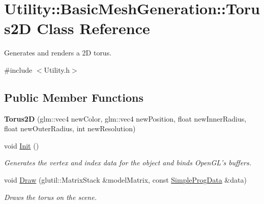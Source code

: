 \hypertarget{class_utility_1_1_basic_mesh_generation_1_1_torus2_d}{\section{Utility\-:\-:Basic\-Mesh\-Generation\-:\-:Torus2\-D Class Reference}
\label{class_utility_1_1_basic_mesh_generation_1_1_torus2_d}
}


Generates and renders a 2\-D torus.  




{\ttfamily \#include $<$Utility.\-h$>$}

\subsection*{Public Member Functions}
\begin{DoxyCompactItemize}
\item 
\hypertarget{class_utility_1_1_basic_mesh_generation_1_1_torus2_d_a605dc54a21bdb6d90fc37b1e4ce1f0e9}{{\bfseries Torus2\-D} (glm\-::vec4 new\-Color, glm\-::vec4 new\-Position, float new\-Inner\-Radius, float new\-Outer\-Radius, int new\-Resolution)}\label{class_utility_1_1_basic_mesh_generation_1_1_torus2_d_a605dc54a21bdb6d90fc37b1e4ce1f0e9}

\item 
void \hyperlink{class_utility_1_1_basic_mesh_generation_1_1_torus2_d_a9758c5641d853f3386caee4068b070f1}{Init} ()
\begin{DoxyCompactList}\small\item\em Generates the vertex and index data for the object and binds Open\-G\-L's buffers. \end{DoxyCompactList}\item 
\hypertarget{class_utility_1_1_basic_mesh_generation_1_1_torus2_d_a1e804b9d1f42094ce74b5ed56f157664}{void \hyperlink{class_utility_1_1_basic_mesh_generation_1_1_torus2_d_a1e804b9d1f42094ce74b5ed56f157664}{Draw} (glutil\-::\-Matrix\-Stack \&model\-Matrix, const \hyperlink{struct_simple_prog_data}{Simple\-Prog\-Data} \&data)}\label{class_utility_1_1_basic_mesh_generation_1_1_torus2_d_a1e804b9d1f42094ce74b5ed56f157664}

\begin{DoxyCompactList}\small\item\em Draws the torus on the scene. \end{DoxyCompactList}\end{DoxyCompactItemize}

